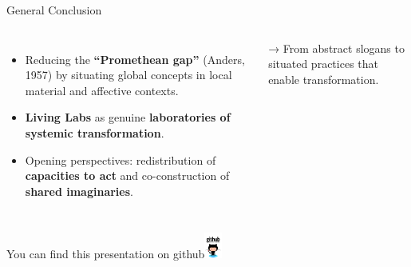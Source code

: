 \documentclass[newPxFont]{beamer}
\begin{document}
\begin{frame}[c]{General Conclusion}
  \vspace{-0.5cm}
  \begin{columns}[onlytextwidth,T]
    \column{\dimexpr\linewidth-30mm-5mm}

    \begin{itemize}
      \item Reducing the \textbf{“Promethean gap”} (Anders, 1957) by situating global concepts in local material and affective contexts.  
      \item \textbf{Living Labs} as genuine \textbf{laboratories of systemic transformation}.  
      \item Opening perspectives: redistribution of \textbf{capacities to act} and co-construction of \textbf{shared imaginaries}.  
    \end{itemize}

    \vspace{0.3cm}
    → From abstract slogans to situated practices that enable transformation.

    \column{30mm}
    \vspace{1.5cm}
  \end{columns}
\end{frame}


{
%
\begin{frame}
  \vspace{-1em}
  \begin{minipage}[t][.8\textheight]{\textwidth}

    \vfill

  \end{minipage}
  \vspace{-3.5em}
  \centering
	You can find this presentation on github\includegraphics[height=0.85cm]{img/github}

\end{frame}
}
\end{document}
